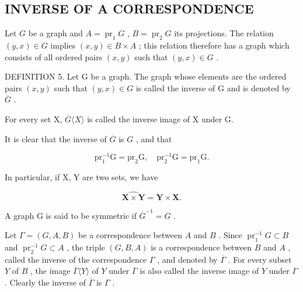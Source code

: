 \subsection{INVERSE OF A CORRESPONDENCE}

Let \(G\) be a graph and \(A = \operatorname{pr}_1 G\) , \(B = \operatorname{pr}_2 G\) its projections. The relation \((y, x) \in G\) implies \((x, y) \in B \times A\) ; this relation therefore has a graph which consists of all ordered pairs \((x, y)\) such that \((y, x) \in G\) .

DEFINITION 5. Let G be a graph. The graph whose elements are the ordered pairs \((x, y)\) such that \((y, x) \in G\) is called the inverse of G and is denoted by \(\overline{G}\) .

For every set X, \(\overline{G}\langle X\rangle\) is called the inverse image of X under G.

It is clear that the inverse of \(\overline{G}\) is \(G\) , and that

\[
\mathrm{pr} _ {1} ^ {- 1} \mathrm{G} = \mathrm{pr} _ {2} \mathrm{G}, \quad \mathrm{pr} _ {2} ^ {- 1} \mathrm{G} = \mathrm{pr} _ {1} \mathrm{G}.
\]

In particular, if X, Y are two sets, we have

\[
\widehat {\mathbf {X} \times \mathbf {Y}} = \mathbf {Y} \times \mathbf {X}.
\]

A graph G is said to be symmetric if \(\overline{G}^{-1}=G\) .

Let \(\Gamma = (G, A, B)\) be a correspondence between \(A\) and \(B\) . Since \(\operatorname{pr}_1^{\overline{-1}} G \subset B\) and \(\operatorname{pr}_2^{\overline{-1}} G \subset A\) , the triple \((G, B, A)\) is a correspondence between \(B\) and \(A\) , called the inverse of the correspondence \(\Gamma\) , and denoted by \(\overline{\Gamma}\) . For every subset \(Y\) of \(B\) , the image \(\overline{\Gamma} \langle Y \rangle\) of \(Y\) under \(\overline{\Gamma}\) is also called the inverse image of \(Y\) under \(\Gamma\) . Clearly the inverse of \(\overline{\Gamma}\) is \(\Gamma\) .

